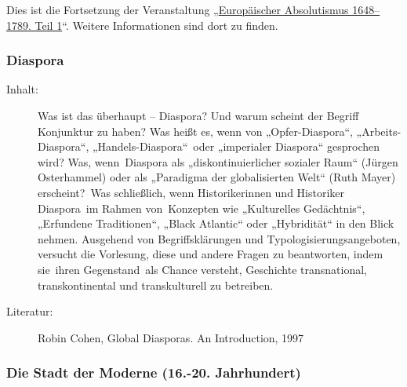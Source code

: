 \documentclass[%
a4paper, %
11pt,               %
leqno,              %
fleqn,              %
]
{scrartcl}
\begin{document}
Dies ist die Fortsetzung der Veranstaltung „\hyperref[ssub:Europäischer
Absolutismus 1648--1789. Teil 1]{Europäischer Absolutismus 1648--1789. Teil 1}“.
Weitere Informationen sind dort zu finden.


\subsubsection{Diaspora} %
\label{ssub:Diaspora}

\begin{description}
  \item[Inhalt:] Was ist das überhaupt -- Diaspora? Und warum scheint der
    Begriff Konjunktur zu haben? Was heißt es, wenn von „Opfer-Diaspora“,
    „Arbeits-Diaspora“, „Handels-Diaspora“ oder „imperialer Diaspora“ gesprochen
    wird? Was, wenn Diaspora als „diskontinuierlicher sozialer Raum“ (Jürgen
    Osterhammel) oder als „Paradigma der globalisierten Welt“ (Ruth Mayer)
    erscheint? Was schließlich, wenn Historikerinnen und Historiker Diaspora im
    Rahmen von Konzepten wie „Kulturelles Gedächtnis“, „Erfundene Traditionen“,
    „Black Atlantic“ oder „Hybridität“ in den Blick nehmen. Ausgehend von
    Begriffsklärungen und Typologisierungsangeboten, versucht die Vorlesung,
    diese und andere Fragen zu beantworten, indem sie ihren Gegenstand als
    Chance versteht, Geschichte transnational, transkontinental und
    transkulturell zu betreiben. 
  \item[Literatur:] Robin Cohen, Global Diasporas. An Introduction, 1997
\end{description}


\subsubsection{Die Stadt der Moderne (16.-20. Jahrhundert)} %
\label{ssub:Die Stadt der Moderne (16.--20. Jahrhundert)}
\end{document}
